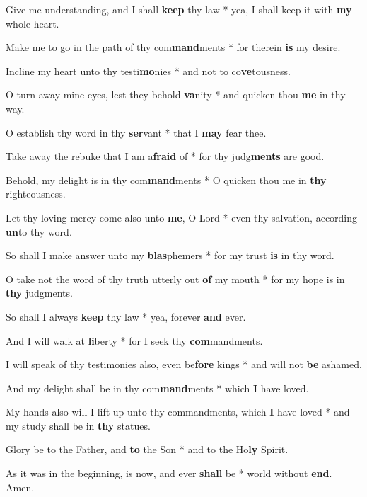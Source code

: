 \begin{multicols}{2}
	Give me understanding, and I shall \textbf{keep} thy law * yea, I shall keep it with \textbf{my} whole heart.
	
	Make me to go in the path of thy com\textbf{mand}ments * for therein \textbf{is} my desire.
	
	Incline my heart unto thy testi\textbf{mo}nies * and not to co\textbf{ve}tousness.
	
	O turn away mine eyes, lest they behold \textbf{va}nity * and quicken thou \textbf{me} in thy way.
	
	O establish thy word in thy \textbf{ser}vant * that I \textbf{may} fear thee.
	
	Take away the rebuke that I am a\textbf{fraid} of * for thy judg\textbf{ments} are good.
	
	Behold, my delight is in thy com\textbf{mand}ments * O quicken thou me in \textbf{thy} righteousness.
	
	Let thy loving mercy come also unto \textbf{me}, O Lord * even thy salvation, according \textbf{un}to thy word.
	
	So shall I make answer unto my \textbf{blas}phemers * for my trust \textbf{is} in thy word.
	
	O take not the word of thy truth utterly out \textbf{of} my mouth * for my hope is in \textbf{thy} judgments.
	
	So shall I always \textbf{keep} thy law * yea, forever \textbf{and} ever.
	
	And I will walk at \textbf{li}berty * for I seek thy \textbf{com}mandments.
	
	I will speak of thy testimonies also, even be\textbf{fore} kings * and will not \textbf{be} ashamed.
	
	And my delight shall be in thy com\textbf{mand}ments * which \textbf{I} have loved.
	
	My hands also will I lift up unto thy commandments, which \textbf{I} have loved * and my study shall be in \textbf{thy} statues.
	
	Glory be to the Father, and \textbf{to} the Son * and to the Ho\textbf{ly} Spirit.
	
	As it was in the beginning, is now, and ever \textbf{shall} be * world without \textbf{end}. Amen.
\end{multicols}
